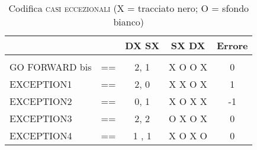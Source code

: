 \begin{table}[h]\footnotesize
\center
\begin{tabular}{llccc}
\label{eccezioni}
								&			&	DX  SX	&	SX  	DX    &    Errore\\
 \hline\\
	GO FORWARD bis    	&	== 	&	2, 1		&	X O  O X	&  0\\
	EXCEPTION1       		&	==  	&	2, 0		&	X X  O X   &	1\\
  	EXCEPTION2        	&	== 	&	0, 1  	&	X O  X X   &  -1\\
 	EXCEPTION3     	 	&	==  	&	2, 2	 	&	O X  O X	&  0\\
 	 EXCEPTION4           &	==  &1 , 1      & X O  X O     &	 0\\         
 	\hline
\end{tabular}
\caption{Codifica \textsc{casi eccezionali} (X = tracciato nero; O = sfondo bianco)}
\label{eccezioni}
\end{table}



%
%

